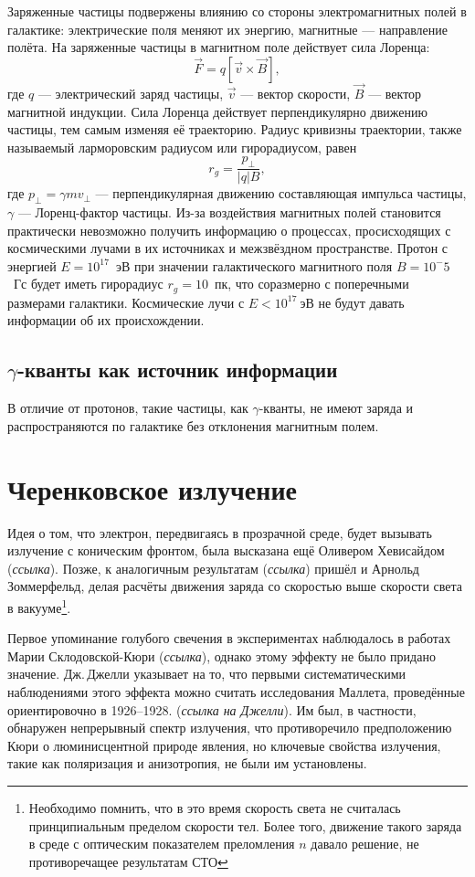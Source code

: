 \documentclass[magd,floatypics,numeref]{msudipl} %
\begin{document}
Заряженные частицы подвержены влиянию со стороны электромагнитных полей в галактике: электрические поля меняют их энергию, магнитные --- направление полёта. На заряженные частицы в магнитном поле действует сила Лоренца:
\begin{equation}
\vec F = q\left[\vec v\times \vec B\right],
\end{equation}
где $q$ --- электрический заряд частицы, $\vec v$ --- вектор скорости, $\vec B$ --- вектор магнитной индукции. Сила Лоренца действует перпендикулярно движению частицы, тем самым изменяя её траекторию. Радиус кривизны траектории, также называемый ларморовским радиусом или гирорадиусом, равен
\begin{equation}
r_g = \frac{p_{\bot}}{|q|B},
\end{equation}
где $p_{\bot}=\gamma m v_{\bot}$ --- перпендикулярная движению составляющая импульса частицы, $\gamma$ --- Лоренц-фактор частицы. Из-за воздействия магнитных полей становится практически невозможно получить информацию о процессах, просисходящих с космическими лучами в их источниках и межзвёздном пространстве. Протон с энергией $E=10^{17}$~эВ при значении галактического магнитного поля $B=10^-5$~Гс будет иметь гирорадиус $r_g=10$~пк, что соразмерно с поперечными размерами галактики. Космические лучи с $E<10^{17}~$эВ не будут давать информации об их происхождении. 
\subsection{$\gamma$-кванты как источник информации}
В отличие от протонов, такие частицы, как $\gamma$-кванты, не имеют заряда и распространяются по галактике без отклонения магнитным полем.
\section{Черенковское излучение}
Идея о том, что электрон, передвигаясь в прозрачной среде, будет вызывать излучение с коническим фронтом, была высказана ещё Оливером Хевисайдом (\textit{ссылка}).
Позже, к аналогичным результатам (\textit{ссылка}) пришёл и Арнольд Зоммерфельд, делая расчёты движения заряда со скоростью выше скорости света в вакууме\footnote{Необходимо помнить, что в это время скорость света не считалась принципиальным пределом скорости тел. Более того, движение такого заряда в среде с оптическим показателем преломления $n$ давало решение, не противоречащее результатам СТО}. 

Первое упоминание голубого свечения в экспериментах наблюдалось в работах Марии Склодовской-Кюри (\textit{ссылка}), однако этому эффекту не было придано значение. Дж.\,Джелли указывает на то, что первыми систематическими наблюдениями этого эффекта можно считать исследования Маллета, проведённые ориентировочно в 1926--1928. (\textit{ссылка на Джелли}). Им был, в частности, обнаружен непрерывный спектр излучения, что противоречило предположению Кюри о люминисцентной природе явления, но ключевые свойства излучения, такие как поляризация и анизотропия, не были им установлены. 
\end{document}
